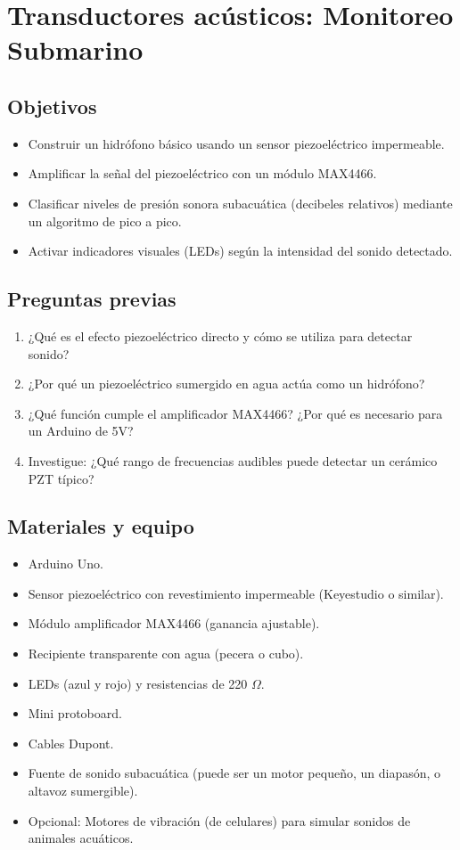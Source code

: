 \chapter{Transductores acústicos: Monitoreo Submarino}

\section*{Objetivos}
\begin{itemize}
    \item Construir un hidrófono básico usando un sensor piezoeléctrico impermeable.
    \item Amplificar la señal del piezoeléctrico con un módulo MAX4466.
    \item Clasificar niveles de presión sonora subacuática (decibeles relativos) mediante un algoritmo de pico a pico.
    \item Activar indicadores visuales (LEDs) según la intensidad del sonido detectado.
\end{itemize}

\section*{Preguntas previas}
\begin{enumerate}
    \item ¿Qué es el efecto piezoeléctrico directo y cómo se utiliza para detectar sonido?
    \item ¿Por qué un piezoeléctrico sumergido en agua actúa como un hidrófono?
    \item ¿Qué función cumple el amplificador MAX4466? ¿Por qué es necesario para un Arduino de 5V?
    \item Investigue: ¿Qué rango de frecuencias audibles puede detectar un cerámico PZT típico?
\end{enumerate}

\section*{Materiales y equipo}
\begin{itemize}
    \item Arduino Uno.
    \item Sensor piezoeléctrico con revestimiento impermeable (Keyestudio o similar).
    \item Módulo amplificador MAX4466 (ganancia ajustable).
    \item Recipiente transparente con agua (pecera o cubo).
    \item LEDs (azul y rojo) y resistencias de 220 $\Omega$.
    \item Mini protoboard.
    \item Cables Dupont.
    \item Fuente de sonido subacuática (puede ser un motor pequeño, un diapasón, o altavoz sumergible).
    \item Opcional: Motores de vibración (de celulares) para simular sonidos de animales acuáticos.
\end{itemize}

